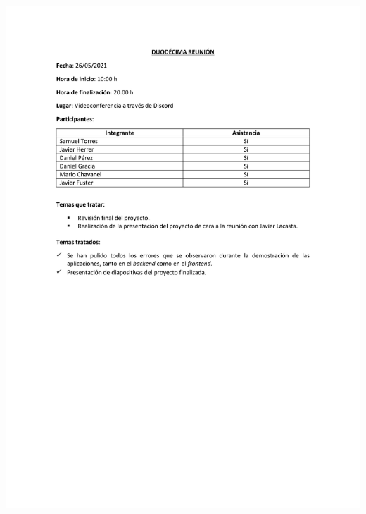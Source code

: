 \documentclass{article}
\begin{document}
\includegraphics[width=\textwidth]{../images/actas/Acta_reunion_12.pdf}
\end{document}
